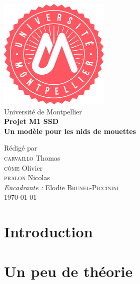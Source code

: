 \documentclass[frenchb]{report}
\newcommand{\1}{\mathbbm{1}}
\theoremstyle{definition}\newtheorem{defn}{Définition}
\theoremstyle{definition}\newtheorem{exm}{Exemple}
\theoremstyle{definition}\newtheorem{nota}{Notation}
\theoremstyle{definition}\newtheorem{rem}{Remarque}
\begin{document}
\begin{titlepage}
\begin{center}
\includegraphics[scale=0.5]{logo.png}\\[1cm]
{\LARGE Université de Montpellier}\\[1.5cm]
\linespread{1.2}\huge {\bfseries Projet M1 SSD }\\[0.5cm]
\linespread{1.2}\LARGE {\bfseries Un modèle pour les nids de mouettes}\\[1.5cm]
\linespread{1}

{\large Rédigé par\\}
{\Large \textsc{carvaillo} Thomas}\\
{\Large \textsc{côme} Olivier}\\
{\Large \textsc{pralon} Nicolas}\\[1cm]
{\large \emph{Encadrante :} Elodie \textsc{Brunel-Piccinini}}\\[1cm] %
\today
\end{center}
\end{titlepage}
\tableofcontents
\newpage

\chapter*{Introduction}


\pagebreak


\chapter{Un peu de théorie}
\end{document}
